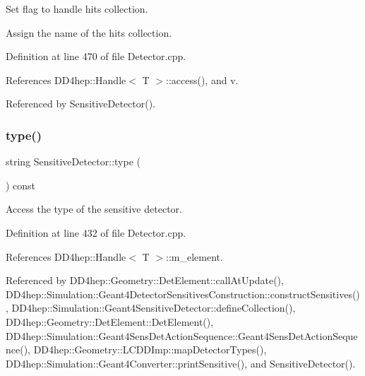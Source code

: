 Set flag to handle hits collection. 

Assign the name of the hits collection. 

Definition at line 470 of file Detector.\+cpp.



References D\+D4hep\+::\+Handle$<$ T $>$\+::access(), and v.



Referenced by Sensitive\+Detector().

\hypertarget{class_d_d4hep_1_1_geometry_1_1_sensitive_detector_ab4ae71a64aeb6736d325a38469f7bcb8}{}\label{class_d_d4hep_1_1_geometry_1_1_sensitive_detector_ab4ae71a64aeb6736d325a38469f7bcb8} 
\subsubsection{\texorpdfstring{type()}{type()}}
{\footnotesize\ttfamily string Sensitive\+Detector\+::type (\begin{DoxyParamCaption}{ }\end{DoxyParamCaption}) const}



Access the type of the sensitive detector. 



Definition at line 432 of file Detector.\+cpp.



References D\+D4hep\+::\+Handle$<$ T $>$\+::m\+\_\+element.



Referenced by D\+D4hep\+::\+Geometry\+::\+Det\+Element\+::call\+At\+Update(), D\+D4hep\+::\+Simulation\+::\+Geant4\+Detector\+Sensitives\+Construction\+::construct\+Sensitives(), D\+D4hep\+::\+Simulation\+::\+Geant4\+Sensitive\+Detector\+::define\+Collection(), D\+D4hep\+::\+Geometry\+::\+Det\+Element\+::\+Det\+Element(), D\+D4hep\+::\+Simulation\+::\+Geant4\+Sens\+Det\+Action\+Sequence\+::\+Geant4\+Sens\+Det\+Action\+Sequence(), D\+D4hep\+::\+Geometry\+::\+L\+C\+D\+D\+Imp\+::map\+Detector\+Types(), D\+D4hep\+::\+Simulation\+::\+Geant4\+Converter\+::print\+Sensitive(), and Sensitive\+Detector().

\hypertarget{class_d_d4hep_1_1_geometry_1_1_sensitive_detector_a133502f6af4d36644001fd188d283d4b}{}\label{class_d_d4hep_1_1_geometry_1_1_sensitive_detector_a133502f6af4d36644001fd188d283d4b} 
